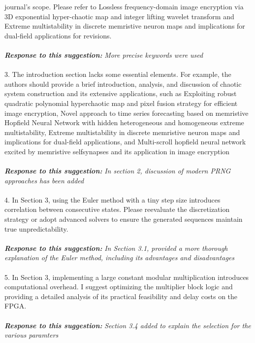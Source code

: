 \documentclass{report}
\begin{document}
journal's scope. Please refer to Lossless frequency-domain image encryption via 3D
exponential hyper-chaotic map and integer lifting wavelet transform and Extreme
multistability in discrete memristive neuron maps and implications for dual-field
applications for revisions.
\\
\\ 
\textbf{\textit{Response to this suggestion:}}
\textit{More precise keywords were used}
\\
\\
3. The introduction section lacks some essential elements. For example, the authors
should provide a brief introduction, analysis, and discussion of chaotic system
construction and its extensive applications, such as Exploiting robust quadratic
polynomial hyperchaotic map and pixel fusion strategy for efficient image encryption,
Novel approach to time series forecasting based on memristive Hopfield Neural Network
with hidden heterogeneous and homogeneous extreme multistability, Extreme
multistability in discrete memristive neuron maps and implications for dual-field
applications, and Multi-scroll hopfield neural network excited by memristive selfsynapses and its application in image encryption
\\
\\
\textbf{\textit{Response to this suggestion:}}
\textit{In section 2, discussion of modern PRNG approaches has been added}
\\
\\
4. In Section 3, using the Euler method with a tiny step size introduces correlation
between consecutive states. Please reevaluate the discretization strategy or adopt
advanced solvers to ensure the generated sequences maintain true unpredictability.
\\
\\
\textbf{\textit{Response to this suggestion:}}
\textit{In Section 3.1, provided a more thorough explanation of the Euler method, including its advantages and disadvantages}
\\
\\
5. In Section 3, implementing a large constant modular multiplication introduces
computational overhead. I suggest optimizing the multiplier block logic and providing a
detailed analysis of its practical feasibility and delay costs on the FPGA.
\\
\\
\textbf{\textit{Response to this suggestion:}}
\textit{Section 3.4 added to explain the selection for the various paramters}
\\
\end{document}
